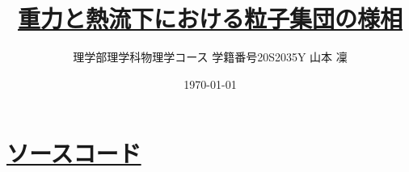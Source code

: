 \documentclass[dvipdfmx]{jsarticle}
\begin{document}
\title{\href{https://github.com/m-agnet/Report.git}{重力と熱流下における粒子集団の様相}}
\author{理学部理学科物理学コース 学籍番号20S2035Y 山本 凜}
\date{\today}
\maketitle
\newpage
\setcounter{tocdepth}{3}
\tableofcontents
\newpage

% 

% 

\appendix
\section{\href{https://github.com/m-agnet/Report.git}{ソースコード}}







\end{document}
